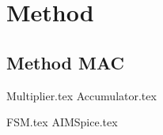\section{Method}
\subsection{Method MAC} 
{Multiplier.tex}
{Accumulator.tex}


{FSM.tex}
{AIMSpice.tex}

